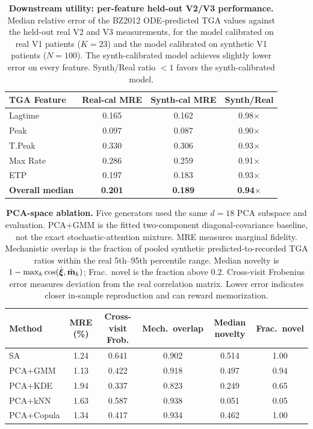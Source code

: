 \begin{table}[ht]
\centering
\caption{\textbf{Downstream utility: per-feature held-out V2/V3 performance.}
Median relative error of the BZ2012 ODE-predicted TGA values against the held-out
real V2 and V3 measurements, for the model calibrated on real V1 patients
($K{=}23$) and the model calibrated on synthetic V1 patients ($N{=}100$). The
synth-calibrated model achieves slightly lower error on every feature. Synth/Real
ratio $< 1$ favors the synth-calibrated model.}
\label{stab:downstream-utility}
\begin{tabular}{lccc}
\toprule
TGA Feature & Real-cal MRE & Synth-cal MRE & Synth/Real \\
\midrule
Lagtime           & 0.165 & 0.162 & 0.98$\times$ \\
Peak              & 0.097 & 0.087 & 0.90$\times$ \\
T.Peak            & 0.330 & 0.306 & 0.93$\times$ \\
Max Rate          & 0.286 & 0.259 & 0.91$\times$ \\
ETP               & 0.197 & 0.183 & 0.93$\times$ \\
\midrule
\textbf{Overall median} & \textbf{0.201} & \textbf{0.189} & \textbf{0.94$\times$} \\
\bottomrule
\end{tabular}
\end{table}

\begin{table}[ht]
\centering
\caption{\textbf{PCA-space ablation.} Five generators used the same $d{=}18$ PCA
subspace and evaluation. PCA+GMM is the fitted two-component diagonal-covariance baseline,
not the exact stochastic-attention mixture. MRE measures marginal fidelity. Mechanistic overlap is the fraction
of pooled synthetic predicted-to-recorded TGA ratios within the real 5th--95th percentile
range. Median novelty is $1-\max_k\cos(\hat{\boldsymbol{\xi}},\hat{\mathbf{m}}_k)$; Frac.\ novel is the
fraction above $0.2$. Cross-visit Frobenius error measures deviation from the real correlation
matrix. Lower error indicates closer in-sample reproduction and can reward memorization.}
\label{stab:pca-ablation}
\begin{tabular}{lccccc}
\toprule
Method & MRE (\%) & Cross-visit Frob. & Mech.\ overlap & Median novelty & Frac.\ novel \\
\midrule
SA         & 1.24 & 0.641 & 0.902 & 0.514 & 1.00 \\
PCA+GMM    & 1.13 & 0.422 & 0.918 & 0.497 & 0.94 \\
PCA+KDE    & 1.94 & 0.337 & 0.823 & 0.249 & 0.65 \\
PCA+kNN    & 1.63 & 0.587 & 0.938 & 0.051 & 0.05 \\
PCA+Copula & 1.34 & 0.417 & 0.934 & 0.462 & 1.00 \\
\bottomrule
\end{tabular}
\end{table}


